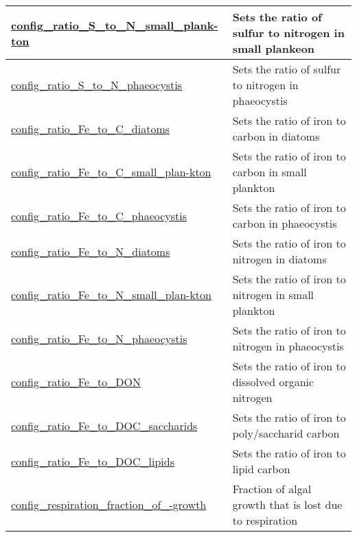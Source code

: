 {\begin{center}
\begin{longtable}{| p{2.0in} || p{4.0in} |}
    \hline
    \hyperref[subsec:nm_sec_config_ratio_S_to_N_small_plankton]{config\_ratio\_S\_to\_N\_small\_plank-}\hyperref[subsec:nm_sec_config_ratio_S_to_N_small_plankton]{ton}& Sets the ratio of sulfur to nitrogen in small plankeon \\
    \hline
    \hyperref[subsec:nm_sec_config_ratio_S_to_N_phaeocystis]{config\_ratio\_S\_to\_N\_phaeocystis} & Sets the ratio of sulfur to nitrogen in phaeocystis \\
    \hline
    \hyperref[subsec:nm_sec_config_ratio_Fe_to_C_diatoms]{config\_ratio\_Fe\_to\_C\_diatoms} & Sets the ratio of iron to carbon in diatoms \\
    \hline
    \hyperref[subsec:nm_sec_config_ratio_Fe_to_C_small_plankton]{config\_ratio\_Fe\_to\_C\_small\_plan-}\hyperref[subsec:nm_sec_config_ratio_Fe_to_C_small_plankton]{kton}& Sets the ratio of iron to carbon in small plankton \\
    \hline
    \hyperref[subsec:nm_sec_config_ratio_Fe_to_C_phaeocystis]{config\_ratio\_Fe\_to\_C\_phaeocystis} & Sets the ratio of iron to carbon in phaeocystis \\
    \hline
    \hyperref[subsec:nm_sec_config_ratio_Fe_to_N_diatoms]{config\_ratio\_Fe\_to\_N\_diatoms} & Sets the ratio of iron to nitrogen in diatoms \\
    \hline
    \hyperref[subsec:nm_sec_config_ratio_Fe_to_N_small_plankton]{config\_ratio\_Fe\_to\_N\_small\_plan-}\hyperref[subsec:nm_sec_config_ratio_Fe_to_N_small_plankton]{kton}& Sets the ratio of iron to nitrogen in small plankton \\
    \hline
    \hyperref[subsec:nm_sec_config_ratio_Fe_to_N_phaeocystis]{config\_ratio\_Fe\_to\_N\_phaeocystis} & Sets the ratio of iron to nitrogen in phaeocystis \\
    \hline
    \hyperref[subsec:nm_sec_config_ratio_Fe_to_DON]{config\_ratio\_Fe\_to\_DON} & Sets the ratio of iron to dissolved organic nitrogen \\
    \hline
    \hyperref[subsec:nm_sec_config_ratio_Fe_to_DOC_saccharids]{config\_ratio\_Fe\_to\_DOC\_saccharids} & Sets the ratio of iron to poly/saccharid carbon \\
    \hline
    \hyperref[subsec:nm_sec_config_ratio_Fe_to_DOC_lipids]{config\_ratio\_Fe\_to\_DOC\_lipids} & Sets the ratio of iron to lipid carbon \\
    \hline
    \hyperref[subsec:nm_sec_config_respiration_fraction_of_growth]{config\_respiration\_fraction\_of\_-}\hyperref[subsec:nm_sec_config_respiration_fraction_of_growth]{growth}& Fraction of algal growth that is lost due to respiration \\

\end{longtable}
\end{center}}
